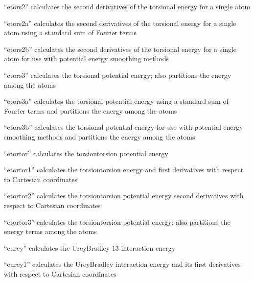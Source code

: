 \documentclass[letterpaper,11pt,english]{sphinxmanual}
\begin{document}
“etors2” calculates the second derivatives of the torsional
energy for a single atom


“etors2a” calculates the second derivatives of the torsional
energy for a single atom using a standard sum of Fourier terms


“etors2b” calculates the second derivatives of the torsional
energy for a single atom for use with potential energy
smoothing methods


“etors3” calculates the torsional potential energy; also
partitions the energy among the atoms


“etors3a” calculates the torsional potential energy using
a standard sum of Fourier terms and partitions the energy
among the atoms


“etors3b” calculates the torsional potential energy for use
with potential energy smoothing methods and partitions the
energy among the atoms


“etortor” calculates the torsion\sphinxhyphen{}torsion potential energy


“etortor1” calculates the torsion\sphinxhyphen{}torsion energy and first
derivatives with respect to Cartesian coordinates


“etortor2” calculates the torsion\sphinxhyphen{}torsion potential energy
second derivatives with respect to Cartesian coordinates


“etortor3” calculates the torsion\sphinxhyphen{}torsion potential energy;
also partitions the energy terms among the atoms


“eurey” calculates the Urey\sphinxhyphen{}Bradley 1\sphinxhyphen{}3 interaction energy


“eurey1” calculates the Urey\sphinxhyphen{}Bradley interaction energy and
its first derivatives with respect to Cartesian coordinates
\end{document}
